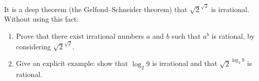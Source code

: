 It is a deep theorem (the Gelfond--Schneider theorem) that $\sqrt2^{\sqrt2}$ is irrational. Without using this fact:
\begin{enumerate}
\item[(a)] Prove that there exist irrational numbers $a$ and $b$ such that $a^b$ is rational, by considering $\sqrt2^{\sqrt2}$.
\item[(b)] Give an explicit example: show that $\log_2 9$ is irrational and that $\sqrt2^{\log_2 9}$ is rational.
\end{enumerate}

